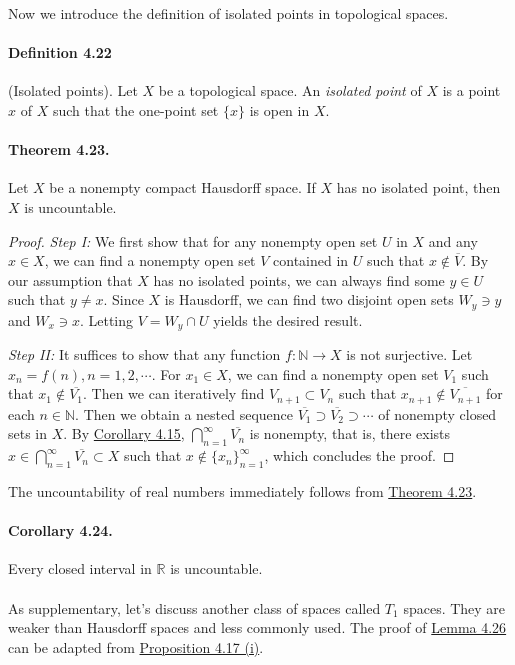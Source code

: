 \documentclass{article}
\numberwithin{equation}{section}
\theoremstyle{plain}
\theoremstyle{definition}
\begin{document}
Now we introduce the definition of isolated points in topological spaces.
\paragraph{Definition 4.22\label{def:4.22}} (Isolated points). Let $X$ be a topological space. An \textit{isolated point} of $X$ is a point $x$ of $X$ such that the one-point set $\{x\}$ is open in $X$.

\paragraph{Theorem 4.23.\label{thm:4.23}} Let $X$ be a nonempty compact Hausdorff space. If $X$ has no isolated point, then $X$ is uncountable.
\begin{proof}
\textit{Step I:} We first show that for any nonempty open set $U$ in $X$ and any $x\in X$, we can find a nonempty open set $V$ contained in $U$ such that $x\notin \overline{V}$. By our assumption that $X$ has no isolated points, we can always find some $y\in U$ such that $y\neq x$. Since $X$ is Hausdorff, we can find two disjoint open sets $W_y\ni y$ and $W_x\ni x$. Letting $V=W_y\cap U$ yields the desired result.

\textit{Step II:} It suffices to show that any function $f:\mathbb{N}\to X$ is not surjective. Let $x_n=f(n),n=1,2,\cdots.$ For $x_1\in X$, we can find a nonempty open set $V_1$ such that $x_1\notin\overline{V_1}$. Then we can iteratively find $V_{n+1}\subset V_n$ such that $x_{n+1}\notin\overline{V_{n+1}}$ for each $n\in\mathbb{N}$. Then we obtain a nested sequence $\overline{V_1}\supset\overline{V_2}\supset\cdots$ of nonempty closed sets in $X$. By \hyperref[cor:4.15]{Corollary 4.15}, $\bigcap_{n=1}^\infty \overline{V_n}$ is nonempty, that is, there exists $x\in\bigcap_{n=1}^\infty \overline{V_n}\subset X$ such that $x\notin\{x_n\}_{n=1}^\infty$, which concludes the proof.
\end{proof}

The uncountability of real numbers immediately follows from \hyperref[thm:4.23]{Theorem 4.23}.
\paragraph{Corollary 4.24.\label{cor:4.24}} Every closed interval in $\mathbb{R}$ is uncountable.

\paragraph{} As supplementary, let's discuss another class of spaces called $T_1$ spaces. They are weaker than Hausdorff spaces and less commonly used. The proof of \hyperref[lemma:4.26]{Lemma 4.26} can be adapted from \hyperref[prop:4.17]{Proposition 4.17 (i)}.
\end{document}
